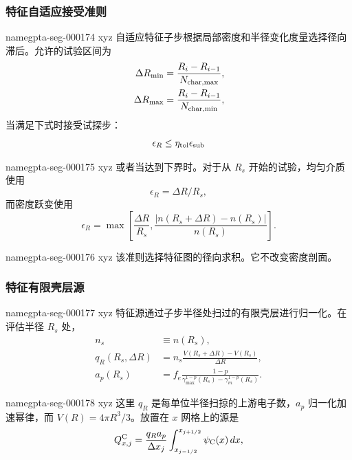 \documentclass[twocolumn]{aastex702}
\makeatletter
\providecommand{\gptareaderanchor}[1]{\pdfdest name{#1} xyz}%
\providecommand{\gptareaderanchor}[1]{\special{pdf:dest (#1) [ @thispage /XYZ @xpos @ypos null ]}}%
\makeatother
\begin{document}
\subsubsection{特征自适应接受准则}


\gptareaderanchor{gpta-seg-000174}%
自适应特征子步根据局部密度和半径变化度量选择径向滞后。允许的试验区间为
\begin{equation}
\begin{aligned}
\Delta R_{\min}&=\frac{R_i-R_{i-1}}{N_{\rm char,max}},\\
\Delta R_{\max}&=\frac{R_i-R_{i-1}}{N_{\rm char,min}},
\end{aligned}
\end{equation}
当满足下式时接受试探步：
\begin{equation}
\epsilon_R\le\eta_{\rm tol}\epsilon_{\rm sub}
\end{equation}

\gptareaderanchor{gpta-seg-000175}%
或者当达到下界时。对于从 \(R_s\) 开始的试验，均匀介质使用
\begin{equation}
\epsilon_R=\Delta R/R_s,
\end{equation}
而密度跃变使用
\begin{equation}
\epsilon_R=\max\left[
\frac{\Delta R}{R_s},
\frac{|n(R_s+\Delta R)-n(R_s)|}{n(R_s)}
\right].
\end{equation}

\gptareaderanchor{gpta-seg-000176}%
该准则选择特征图的径向求积。它不改变密度剖面。

\subsubsection{特征有限壳层源}


\gptareaderanchor{gpta-seg-000177}%
特征源通过子步半径处扫过的有限壳层进行归一化。在评估半径 \(R_s\) 处，
\begin{equation}
\begin{aligned}
n_s&\equiv n(R_s),\\
q_R(R_s,\Delta R)&=
n_s\frac{V(R_s+\Delta R)-V(R_s)}{\Delta R},\\
a_p(R_s)&=f_e\frac{1-p}{\gamma_{\max}^{1-p}(R_s)-\gamma_m^{1-p}(R_s)} .
\end{aligned}
\end{equation}

\gptareaderanchor{gpta-seg-000178}%
这里 \(q_R\) 是每单位半径扫掠的上游电子数，\(a_p\) 归一化加速幂律，而 \(V(R)=4\pi R^3/3\)。放置在 \(x\) 网格上的源是
\begin{equation}
Q_{x,j}^{\rm C}=\frac{q_Ra_p}{\Delta x_j}
\int_{x_{j-1/2}}^{x_{j+1/2}}
\psi_{\rm C}(x)\,dx,
\end{equation}
\end{document}
